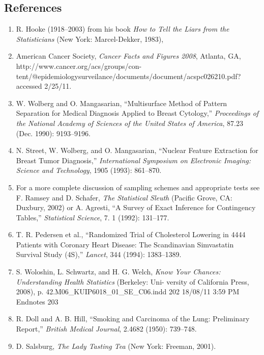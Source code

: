 \documentclass[
]{report}
\begin{document}
\begin{enumerate}
\end{enumerate}

\hypertarget{references-4}{%
\subsection*{References}\label{references-4}}

\begin{enumerate}

\item R. Hooke (1918–2003) from his book \textit{How to Tell the Liars from the Statisticians} (New York: Marcel-Dekker, 1983),
\item American Cancer Society, \textit{Cancer Facts and Figures 2008}, Atlanta, GA, http://www.cancer.org/acs/groups/con-
tent/@epidemiologysurveilance/documents/document/acspc026210.pdf? accessed 2/25/11.
\item W. Wolberg and O. Mangasarian, “Multisurface Method of Pattern Separation for Medical Diagnosis Applied to
Breast Cytology,” \textit{Proceedings of the National Academy of Sciences of the United States of America}, 87.23 (Dec.
1990): 9193–9196.
\item N. Street, W. Wolberg, and O. Mangasarian, “Nuclear Feature Extraction for Breast Tumor Diagnosis,” \textit{International
Symposium on Electronic Imaging: Science and Technology}, 1905 (1993): 861–870.
\item For a more complete discussion of sampling schemes and appropriate tests see F. Ramsey and D. Schafer, \textit{The
Statistical Sleuth} (Pacific Grove, CA: Duxbury, 2002) or A. Agresti, “A Survey of Exact Inference for Contingency
Tables,” \textit{Statistical Science}, 7. 1 (1992): 131–177.
\item T. R. Pedersen et al., “Randomized Trial of Cholesterol Lowering in 4444 Patients with Coronary Heart Disease:
The Scandinavian Simvastatin Survival Study (4S),” \textit{Lancet}, 344 (1994): 1383–1389.
\item S. Woloshin, L. Schwartz, and H. G. Welch, \textit{Know Your Chances: Understanding Health Statistics} (Berkeley: Uni-
versity of California Press, 2008), p. 42.M06\_KUIP6018\_01\_SE\_C06.indd 202 18/08/11 3:59 PM Endnotes 203
\item R. Doll and A. B. Hill, “Smoking and Carcinoma of the Lung: Preliminary Report,” \textit{British Medical Journal}, 2.4682
(1950): 739–748.
\item D. Salsburg, \textit{The Lady Tasting Tea} (New York: Freeman, 2001).

\end{enumerate}
\end{document}
